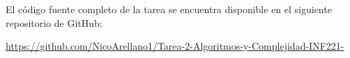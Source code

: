 El código fuente completo de la tarea se encuentra disponible en el siguiente repositorio de GitHub:

\url{https://github.com/NicoArellano1/Tarea-2-Algoritmos-y-Complejidad-INF221-}